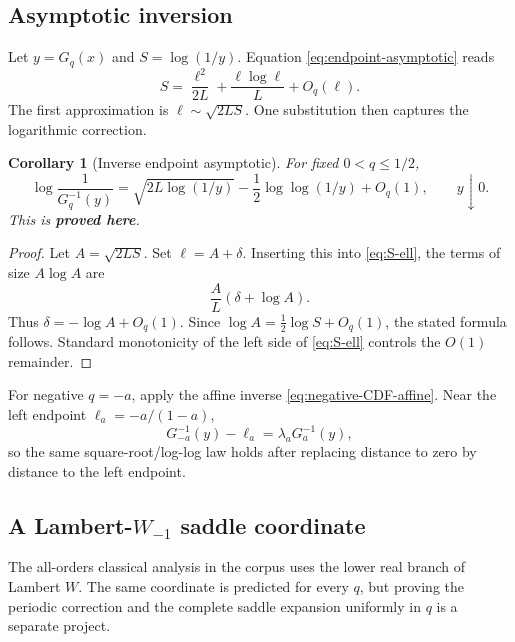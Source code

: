 \documentclass[11pt,oneside]{article}
\numberwithin{equation}{section}
\newtheorem{corollary}[theorem]{Corollary}
\theoremstyle{definition}
\theoremstyle{remark}
\newcommand{\proved}{\textcolor{deepgreen}{\textbf{proved here}}}
\begin{document}
\subsection{Asymptotic inversion}

Let $y=G_q(x)$ and $S=\log(1/y)$.  Equation
\eqref{eq:endpoint-asymptotic} reads
\begin{equation}
 S=\frac{\ell^2}{2L}+\frac{\ell\log\ell}{L}+O_q(\ell).
 \label{eq:S-ell}
\end{equation}
The first approximation is $\ell\sim\sqrt{2LS}$.  One substitution then
captures the logarithmic correction.

\begin{corollary}[Inverse endpoint asymptotic]
\label{cor:inverse-asymptotic}
For fixed $0<q\le1/2$,
\begin{equation}
 \boxed{
 \log\frac1{G_q^{-1}(y)}
 =\sqrt{2L\log(1/y)}
 -\frac12\log\log(1/y)+O_q(1),
 \qquad y\downarrow0.}
 \label{eq:inverse-asymptotic}
\end{equation}
This is \proved.
\end{corollary}

\begin{proof}
Let $A=\sqrt{2LS}$.  Set $\ell=A+\delta$.  Inserting this into
\eqref{eq:S-ell}, the terms of size $A\log A$ are
\[
 \frac{A}{L}(\delta+\log A).
\]
Thus $\delta=-\log A+O_q(1)$.  Since
$\log A=\frac12\log S+O_q(1)$, the stated formula follows.  Standard
monotonicity of the left side of \eqref{eq:S-ell} controls the $O(1)$
remainder.
\end{proof}

For negative $q=-a$, apply the affine inverse
\eqref{eq:negative-CDF-affine}.  Near the left endpoint
$\ell_a=-a/(1-a)$,
\begin{equation}
 G_{-a}^{-1}(y)-\ell_a
 =\lambda_aG_a^{-1}(y),
 \label{eq:negative-inverse-transfer}
\end{equation}
so the same square-root/log-log law holds after replacing distance to zero by
distance to the left endpoint.

\subsection[A Lambert-W-minus-one saddle coordinate]{A Lambert-$W_{-1}$ saddle coordinate}

The all-orders classical analysis in the corpus uses the lower real branch of
Lambert $W$.  The same coordinate is predicted for every $q$, but proving the
periodic correction and the complete saddle expansion uniformly in $q$ is a
separate project.
\end{document}
